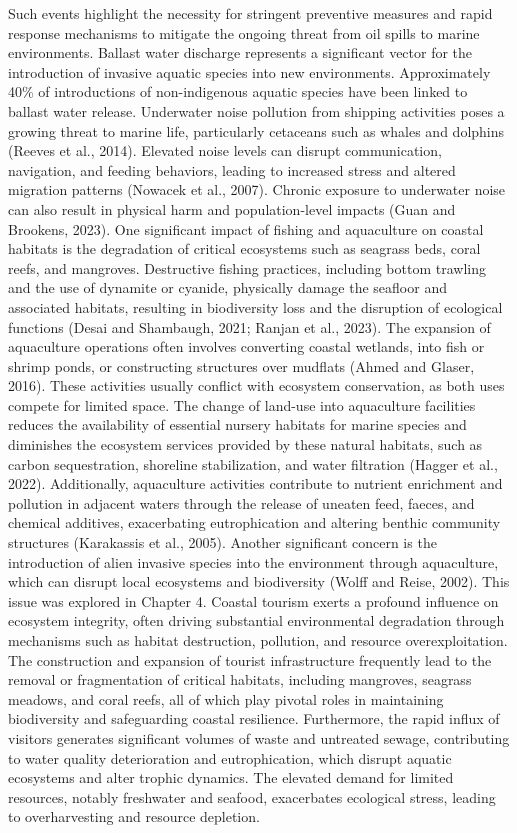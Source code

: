 \documentclass[
  letterpaper,
  11pt,
  english,
  singlespacing,
  headsepline]{MastersDoctoralThesis}
\begin{document}
\begin{spacing}{1.5}
Such events highlight the necessity for stringent preventive measures
and rapid response mechanisms to mitigate the ongoing threat from oil
spills to marine environments. Ballast water discharge represents a
significant vector for the introduction of invasive aquatic species into
new environments. Approximately 40\% of introductions of non-indigenous
aquatic species have been linked to ballast water release. Underwater
noise pollution from shipping activities poses a growing threat to
marine life, particularly cetaceans such as whales and dolphins (Reeves
et al., 2014). Elevated noise levels can disrupt communication,
navigation, and feeding behaviors, leading to increased stress and
altered migration patterns (Nowacek et al., 2007). Chronic exposure to
underwater noise can also result in physical harm and population-level
impacts (Guan and Brookens, 2023). One significant impact of fishing and
aquaculture on coastal habitats is the degradation of critical
ecosystems such as seagrass beds, coral reefs, and mangroves.
Destructive fishing practices, including bottom trawling and the use of
dynamite or cyanide, physically damage the seafloor and associated
habitats, resulting in biodiversity loss and the disruption of
ecological functions (Desai and Shambaugh, 2021; Ranjan et al., 2023).
The expansion of aquaculture operations often involves converting
coastal wetlands, into fish or shrimp ponds, or constructing structures
over mudflats (Ahmed and Glaser, 2016). These activities usually
conflict with ecosystem conservation, as both uses compete for limited
space. The change of land-use into aquaculture facilities reduces the
availability of essential nursery habitats for marine species and
diminishes the ecosystem services provided by these natural habitats,
such as carbon sequestration, shoreline stabilization, and water
filtration (Hagger et al., 2022). Additionally, aquaculture activities
contribute to nutrient enrichment and pollution in adjacent waters
through the release of uneaten feed, faeces, and chemical additives,
exacerbating eutrophication and altering benthic community structures
(Karakassis et al., 2005). Another significant concern is the
introduction of alien invasive species into the environment through
aquaculture, which can disrupt local ecosystems and biodiversity (Wolff
and Reise, 2002). This issue was explored in Chapter 4. Coastal tourism
exerts a profound influence on ecosystem integrity, often driving
substantial environmental degradation through mechanisms such as habitat
destruction, pollution, and resource overexploitation. The construction
and expansion of tourist infrastructure frequently lead to the removal
or fragmentation of critical habitats, including mangroves, seagrass
meadows, and coral reefs, all of which play pivotal roles in maintaining
biodiversity and safeguarding coastal resilience. Furthermore, the rapid
influx of visitors generates significant volumes of waste and untreated
sewage, contributing to water quality deterioration and eutrophication,
which disrupt aquatic ecosystems and alter trophic dynamics. The
elevated demand for limited resources, notably freshwater and seafood,
exacerbates ecological stress, leading to overharvesting and resource
depletion.


\end{spacing}
\end{document}
